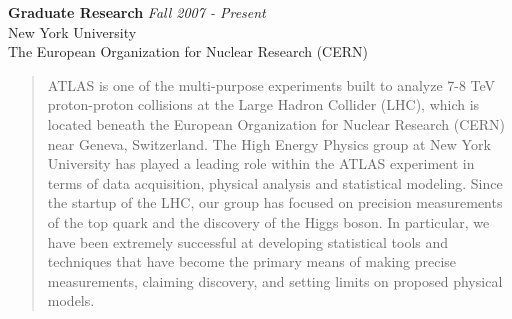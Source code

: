 \documentclass[9pt]{article}
\newenvironment{changemargin}[2]{%
  \begin{list}{}{%
    \setlength{\topsep}{0pt}%
    \setlength{\leftmargin}{#1}%
    \setlength{\rightmargin}{#2}%
    \setlength{\listparindent}{\parindent}%
    \setlength{\itemindent}{\parindent}%
    \setlength{\parsep}{\parskip}%
  }%
  \item[]}{\end{list}
}
\newenvironment{body} {
	\vspace*{-16pt}
	\begin{changemargin}{-0.25in}{-0.5in}
  }	
	{\end{changemargin}
}
\begin{document}
\begin{body}
	\vspace{14pt}
	\textbf{Graduate Research} \hfill \emph{Fall 2007 - Present}\\
	New York University \\
        The European Organization for Nuclear Research (CERN) \\

	\vspace*{-4pt}


        \begin{quotation}
          \justifying

          ATLAS is one of the multi-purpose experiments built to analyze 7-8 TeV proton-proton collisions at the Large Hadron Collider (LHC), 
          which is located beneath the European Organization for Nuclear Research (CERN) near Geneva, Switzerland. 
          The High Energy Physics group at New York University has played a leading role within the ATLAS experiment in terms of data acquisition, physical analysis and statistical modeling. 
          Since the startup of the LHC, our group has focused on precision measurements of the top quark and the discovery of the Higgs boson.
          In particular, we have been extremely successful at developing statistical tools and techniques that have become the primary means of making precise measurements, 
          claiming discovery, and setting limits on proposed physical models.

          \smallskip


\end{quotation}
\end{body}
\end{document}
